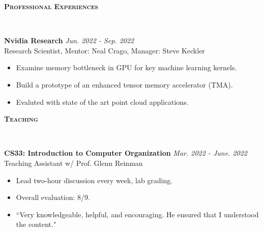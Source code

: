 \documentclass[a4paper]{article}
\newenvironment{changemargin}[2]{%
  \begin{list}{}{%
    \setlength{\topsep}{0pt}%
    \setlength{\leftmargin}{#1}%
    \setlength{\rightmargin}{#2}%
    \setlength{\listparindent}{\parindent}%
    \setlength{\itemindent}{\parindent}%
    \setlength{\parsep}{\parskip}%
  }%
  \item[]}{\end{list}
}
\newcommand{\lineover}{
	\begin{changemargin}{-0.05in}{-0.05in}
		\vspace*{-8pt}
		\hrulefill \\
		\vspace*{-2pt}
	\end{changemargin}
}
\newcommand{\header}[1]{
	\begin{changemargin}{-0.5in}{-0.5in}
		\scshape{\large \textbf{#1}}\\
  	\lineover
	\end{changemargin}
}
\newenvironment{body} {
	\vspace*{-16pt}
	\begin{changemargin}{-0.5in}{-0.5in}
  }	
	{\end{changemargin}
}
\begin{document}
\header{Professional Experiences}

\begin{body}
	\vspace{14pt}
	\textbf{Nvidia Research} \hfill \emph{Jun. 2022 - Sep. 2022} \\
	Research Scientist, Mentor: Neal Crago, Manager: Steve Keckler
	\begin{itemize}
	\itemsep 0pt
	\item Examine memory bottleneck in GPU for key machine learning kernels.
	\item Build a prototype of an enhanced tensor memory accelerator (TMA).
	\item Evaluted with state of the art point cloud applications.
	\end{itemize}
	\smallskip


\end{body}
\smallskip
\smallskip

\newpage
\header{Teaching}

\begin{body}
	\vspace{14pt}
	\textbf{CS33: Introduction to Computer Organization} \hfill \emph{Mar. 2022 - June. 2022} \\
	Teaching Assistant w/ Prof. Glenn Reinman
	\begin{itemize}
	\itemsep 0pt
	\item Lead two-hour discussion every week, lab grading.
	\item Overall evaluation: 8/9.
	\item ``Very knowledgeable, helpful, and encouraging. He ensured that I understood the content."
	\end{itemize}
	\smallskip

\end{body}
\smallskip
\smallskip
\end{document}
